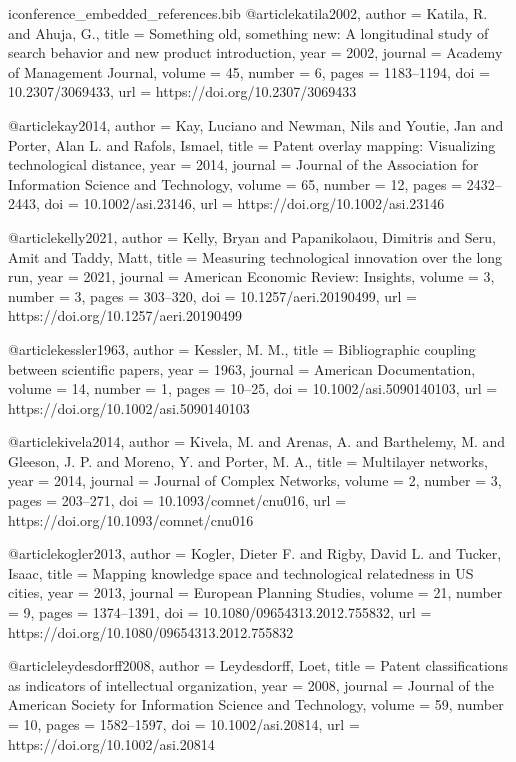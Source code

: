 \begin{filecontents*}[overwrite]{iconference_embedded_references.bib}
@article{katila2002,
  author = {Katila, R. and Ahuja, G.},
  title = {Something old, something new: A longitudinal study of search behavior and new product introduction},
  year = {2002},
  journal = {Academy of Management Journal},
  volume = {45},
  number = {6},
  pages = {1183--1194},
  doi = {10.2307/3069433},
  url = {https://doi.org/10.2307/3069433}
}

@article{kay2014,
  author = {Kay, Luciano and Newman, Nils and Youtie, Jan and Porter, Alan L. and Rafols, Ismael},
  title = {Patent overlay mapping: Visualizing technological distance},
  year = {2014},
  journal = {Journal of the Association for Information Science and Technology},
  volume = {65},
  number = {12},
  pages = {2432--2443},
  doi = {10.1002/asi.23146},
  url = {https://doi.org/10.1002/asi.23146}
}

@article{kelly2021,
  author = {Kelly, Bryan and Papanikolaou, Dimitris and Seru, Amit and Taddy, Matt},
  title = {Measuring technological innovation over the long run},
  year = {2021},
  journal = {American Economic Review: Insights},
  volume = {3},
  number = {3},
  pages = {303--320},
  doi = {10.1257/aeri.20190499},
  url = {https://doi.org/10.1257/aeri.20190499}
}

@article{kessler1963,
  author = {Kessler, M. M.},
  title = {Bibliographic coupling between scientific papers},
  year = {1963},
  journal = {American Documentation},
  volume = {14},
  number = {1},
  pages = {10--25},
  doi = {10.1002/asi.5090140103},
  url = {https://doi.org/10.1002/asi.5090140103}
}

@article{kivela2014,
  author = {Kivela, M. and Arenas, A. and Barthelemy, M. and Gleeson, J. P. and Moreno, Y. and Porter, M. A.},
  title = {Multilayer networks},
  year = {2014},
  journal = {Journal of Complex Networks},
  volume = {2},
  number = {3},
  pages = {203--271},
  doi = {10.1093/comnet/cnu016},
  url = {https://doi.org/10.1093/comnet/cnu016}
}

@article{kogler2013,
  author = {Kogler, Dieter F. and Rigby, David L. and Tucker, Isaac},
  title = {Mapping knowledge space and technological relatedness in {US} cities},
  year = {2013},
  journal = {European Planning Studies},
  volume = {21},
  number = {9},
  pages = {1374--1391},
  doi = {10.1080/09654313.2012.755832},
  url = {https://doi.org/10.1080/09654313.2012.755832}
}

@article{leydesdorff2008,
  author = {Leydesdorff, Loet},
  title = {Patent classifications as indicators of intellectual organization},
  year = {2008},
  journal = {Journal of the American Society for Information Science and Technology},
  volume = {59},
  number = {10},
  pages = {1582--1597},
  doi = {10.1002/asi.20814},
  url = {https://doi.org/10.1002/asi.20814}
}


\end{filecontents*}
